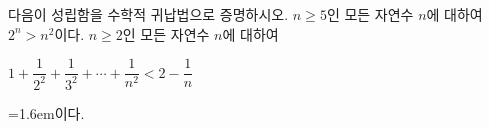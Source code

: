 다음이 성립함을 수학적 귀납법으로 증명하시오.
 $n\ge 5$인 모든 자연수 $n$에 대하여 $2^n>n^2$이다.
 $n\ge 2$인 모든 자연수 $n$에 대하여 \par\smallskip\centerline{$1+\dfrac{1}{2^2}+\dfrac{1}{3^2}+\cdots+\dfrac{1}{n^2}<2-\dfrac{1}{n}$}\par\smallskip\noindent\hangindent=1.6em\relax 이다.
